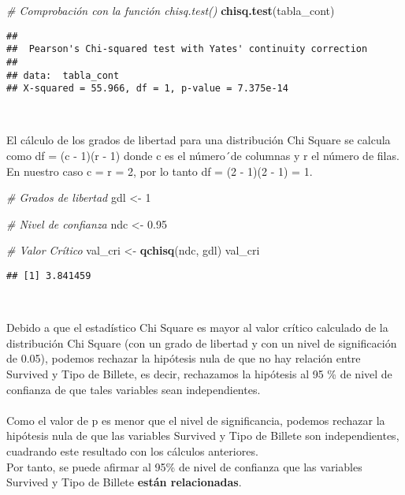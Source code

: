 \documentclass[
]{article}
\newenvironment{Shaded}{\begin{snugshade}}{\end{snugshade}}
\newcommand{\CommentTok}[1]{\textcolor[rgb]{0.56,0.35,0.01}{\textit{#1}}}
\newcommand{\DecValTok}[1]{\textcolor[rgb]{0.00,0.00,0.81}{#1}}
\newcommand{\FloatTok}[1]{\textcolor[rgb]{0.00,0.00,0.81}{#1}}
\newcommand{\KeywordTok}[1]{\textcolor[rgb]{0.13,0.29,0.53}{\textbf{#1}}}
\newcommand{\NormalTok}[1]{#1}
\newcommand{\StringTok}[1]{\textcolor[rgb]{0.31,0.60,0.02}{#1}}
\begin{document}
\begin{Shaded}
\begin{Highlighting}[]
\CommentTok{# Comprobación con la función chisq.test()}
\KeywordTok{chisq.test}\NormalTok{(tabla_cont)}
\end{Highlighting}
\end{Shaded}

\begin{verbatim}
## 
##  Pearson's Chi-squared test with Yates' continuity correction
## 
## data:  tabla_cont
## X-squared = 55.966, df = 1, p-value = 7.375e-14
\end{verbatim}

\texttt{}\\
\texttt{}

El cálculo de los grados de libertad para una distribución Chi Square se
calcula como df = (c - 1)(r - 1) donde c es el número´de columnas y r el
número de filas. En nuestro caso c = r = 2, por lo tanto df = (2 - 1)(2
- 1) = 1.

\texttt{}

\begin{Shaded}
\begin{Highlighting}[]
\CommentTok{# Grados de libertad}
\NormalTok{gdl <-}\StringTok{ }\DecValTok{1}

\CommentTok{# Nivel de confianza}
\NormalTok{ndc <-}\StringTok{ }\FloatTok{0.95}


\CommentTok{# Valor Crítico}
\NormalTok{val_cri <-}\StringTok{ }\KeywordTok{qchisq}\NormalTok{(ndc, gdl)}
\NormalTok{val_cri}
\end{Highlighting}
\end{Shaded}

\begin{verbatim}
## [1] 3.841459
\end{verbatim}

\texttt{}\\
\texttt{}

Debido a que el estadístico Chi Square es mayor al valor crítico
calculado de la distribución Chi Square (con un grado de libertad y con
un nivel de significación de 0.05), podemos rechazar la hipótesis nula
de que no hay relación entre Survived y Tipo de Billete, es decir,
rechazamos la hipótesis al 95 \% de nivel de confianza de que tales
variables sean independientes.\\
\texttt{}~\\
Como el valor de p es menor que el nivel de significancia, podemos
rechazar la hipótesis nula de que las variables Survived y Tipo de
Billete son independientes, cuadrando este resultado con los cálculos
anteriores. \texttt{}\\
Por tanto, se puede afirmar al 95\% de nivel de confianza que las
variables Survived y Tipo de Billete \textbf{están relacionadas}.
\end{document}

